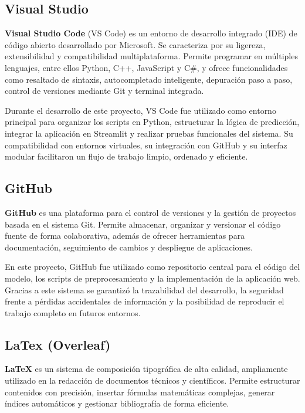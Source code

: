 \subsection{Visual Studio}

\textbf{Visual Studio Code} (VS Code) es un entorno de desarrollo integrado (IDE) de código abierto desarrollado por Microsoft. Se caracteriza por su ligereza, extensibilidad y compatibilidad multiplataforma. Permite programar en múltiples lenguajes, entre ellos Python, C++, JavaScript y C\#, y ofrece funcionalidades como resaltado de sintaxis, autocompletado inteligente, depuración paso a paso, control de versiones mediante Git y terminal integrada.

Durante el desarrollo de este proyecto, VS Code fue utilizado como entorno principal para organizar los scripts en Python, estructurar la lógica de predicción, integrar la aplicación en Streamlit y realizar pruebas funcionales del sistema. Su compatibilidad con entornos virtuales, su integración con GitHub y su interfaz modular facilitaron un flujo de trabajo limpio, ordenado y eficiente.

\subsection{GitHub}
\textbf{GitHub} es una plataforma para el control de versiones y la gestión de proyectos basada en el sistema Git. Permite almacenar, organizar y versionar el código fuente de forma colaborativa, además de ofrecer herramientas para documentación, seguimiento de cambios y despliegue de aplicaciones.

En este proyecto, GitHub fue utilizado como repositorio central para el código del modelo, los scripts de preprocesamiento y la implementación de la aplicación web. Gracias a este sistema se garantizó la trazabilidad del desarrollo, la seguridad frente a pérdidas accidentales de información y la posibilidad de reproducir el trabajo completo en futuros entornos.

\subsection{LaTex (Overleaf)}
\textbf{LaTeX} es un sistema de composición tipográfica de alta calidad, ampliamente utilizado en la redacción de documentos técnicos y científicos. Permite estructurar contenidos con precisión, insertar fórmulas matemáticas complejas, generar índices automáticos y gestionar bibliografía de forma eficiente.

